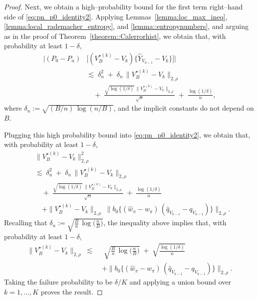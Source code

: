 \documentclass{article}
\theoremstyle{plain}
\theoremstyle{definition}
\theoremstyle{remark}
\begin{document}
\begin{proof}
Next, we obtain a high–probability bound for the first term right–hand side of
\eqref{eq:pn_p0_identity2}.
Applying Lemmas~\ref{lemma:loc_max_ineq}, \ref{lemma:local_rademacher_entropy},
and \ref{lemma::entropynumbers}, and arguing as in the proof of
Theorem~\ref{theorem::Calerrorhist}, we obtain that, with probability at least
\(1 - \delta\),
\[
\begin{aligned}
\Big|(P_0 - P_n)
&\Big[
(V_B^{\star(k)} - V_k)
\big\{
\widehat Y_{V_{k-1}}
-
V_k
\big\}
\Big]\Big|
\\[0.4em]
&\lesssim\;
\delta_n^2
\;+\;
\delta_n\,\|V_B^{\star(k)} - V_k\|_{2,\rho}
\\[0.4em]
&\quad+\;
\frac{\sqrt{\log(1/\delta)}\,\|V_B^{\star(k)} - V_k\|_{2,\rho}}{\sqrt{n}}
\;+\;
\frac{\log(1/\delta)}{n},
\end{aligned}
\]
where \(\delta_n := \sqrt{(B/n)\,\log(n/B)}\), and the implicit constants do
not depend on \(B\).


Plugging this high probability bound into \eqref{eq:pn_p0_identity2},  we obtain that, with probability at least
\(1 - \delta\),
\begin{equation*}
\begin{aligned}
&\|V_B^{\star(k)} - V_k\|_{2,\rho}^2 \\
&\lesssim\;
\delta_n^2
\;+\;
\delta_n\,\|V_B^{\star(k)} - V_k\|_{2,\rho}
\\[0.4em]
&\quad+\;
\frac{\sqrt{\log(1/\delta)}\,\|V_B^{\star(k)} - V_k\|_{2,\rho}}{\sqrt{n}}
\;+\;
\frac{\log(1/\delta)}{n}\\
& \quad + 
\|V_B^{\star(k)} - V_k\|_{2,\rho}\;
\big\|
b_0\{(\widehat w_{\pi} - w_{\pi})\,
(\widehat q_{V_{k-1}} - q_{V_{k-1}})\}
\big\|_{2,\rho}.
\end{aligned}
\end{equation*}
Recalling that $\delta_n := \sqrt{\frac{B}{n}\,\log\Big(\frac{n}{B}\Big)}$, the inequality above implies that, 
with probability at least $1-\delta$,  
 \begin{align*}
\|V_B^{\star(k)} - V_k\|_{2,\rho}
\;\lesssim\;&\;
\sqrt{\frac{B}{n}\,\log\Big(\frac{n}{B}\Big)}
\;+\;
\sqrt{\frac{\log(1/\delta)}{n}}
\\[0.4em]
&  + 
\big\|
b_0\{(\widehat w_{\pi} - w_{\pi})\,
(\widehat q_{V_{k-1}} - q_{V_{k-1}})\}
\big\|_{2,\rho}.
\end{align*}
Taking the failure probability to be \(\delta/K\) and applying a union bound over
\(k=1,\ldots,K\) proves the result.
\end{proof}
\end{document}
